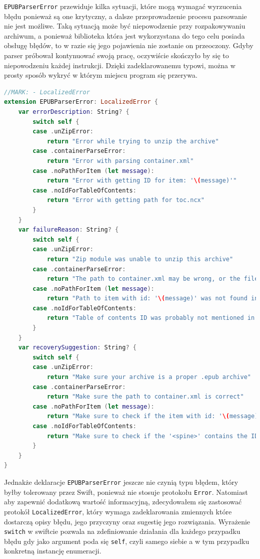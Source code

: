 \texttt{EPUBParserError} przewiduje kilka sytuacji, które mogą wymagać wyrzucenia błędu ponieważ są one krytyczny, a dalsze przeprowadzenie procesu parsowanie nie jest możliwe. Taką sytuacją może być niepowodzenie przy rozpakowywaniu archiwum, a ponieważ biblioteka która jest wykorzystana do tego celu posiada obsługę błędów, to w razie się jego pojawienia nie zostanie on przeoczony. Gdyby parser próbował kontynuować swoją pracę, oczywiście skończyło by się to niepowodzeniu każdej instrukcji. Dzięki zadeklarowanemu typowi, można w prosty sposób wykryć w którym miejscu program się przerywa.

\begin{lstlisting}[firstnumber=8,caption={Rozszeżenie EPUBParserError z zastosowaniem protokołu LocalizedError},language=swift,label=opopopop]
//MARK: - LocalizedError
extension EPUBParserError: LocalizedError {
    var errorDescription: String? {
        switch self {
        case .unZipError:
            return "Error while trying to unzip the archive"
        case .containerParseError:
            return "Error with parsing container.xml"
        case .noPathForItem (let message):
            return "Error with getting ID for item: '\(message)'"
        case .noIdForTableOfContents:
            return "Error with getting path for toc.ncx"
        }
    }
    var failureReason: String? {
        switch self {
        case .unZipError:
            return "Zip module was unable to unzip this archive"
        case .containerParseError:
            return "The path to container.xml may be wrong, or the file itself may be missing"
        case .noPathForItem (let message):
            return "Path to item with id: '\(message)' was not found in the manifest!"
        case .noIdForTableOfContents:
            return "Table of contents ID was probably not mentioned in the spine"
        }
    }
    var recoverySuggestion: String? {
        switch self {
        case .unZipError:
            return "Make sure your archive is a proper .epub archive"
        case .containerParseError:
            return "Make sure the path to container.xml is correct"
        case .noPathForItem (let message):
            return "Make sure to check if the item with id: '\(message)' is in the manifest!"
        case .noIdForTableOfContents:
            return "Make sure to check if the '<spine>' contains the ID for TOC"
        }
    }
}
\end{lstlisting}

Jednakże deklaracje \texttt{EPUBParserError} jeszcze nie czynią typu błędem, który byłby tolerowany przez Swift, ponieważ nie stosuje protokołu \texttt{Error}. Natomiast aby zapewnić dodatkową wartość informacyjną, zdecydowałem się zastosować protokół \texttt{LocalizedError}, który wymaga zadeklarowania zmiennych które dostarczą opisy błędu, jego przyczyny oraz sugestię jego rozwiązania. Wyrażenie \texttt{switch} w swiftcie pozwala na zdefiniowanie działania dla każdego przypadku błędu gdy jako argument poda się \texttt{self}, czyli samego siebie a w tym przypadku konkretną instancję enumeracji.

